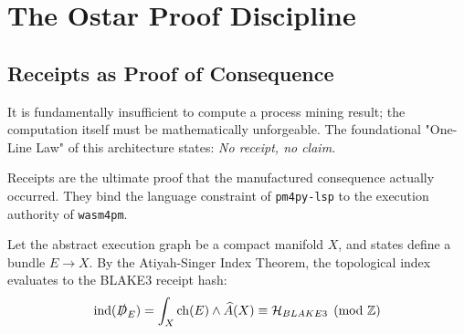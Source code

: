 
\chapter{The Ostar Proof Discipline}
\section{Receipts as Proof of Consequence}
It is fundamentally insufficient to compute a process mining result; the computation itself must be mathematically unforgeable. The foundational "One-Line Law" of this architecture states: \textit{No receipt, no claim.}

Receipts are the ultimate proof that the manufactured consequence actually occurred. They bind the language constraint of \texttt{pm4py-lsp} to the execution authority of \texttt{wasm4pm}.

Let the abstract execution graph be a compact manifold $X$, and states define a bundle $E \to X$. By the Atiyah-Singer Index Theorem, the topological index evaluates to the BLAKE3 receipt hash:
\begin{equation}
\operatorname{ind}(\slashed{D}_E) = \int_X \operatorname{ch}(E) \wedge \widehat{A}(X) \equiv \mathcal{H}_{BLAKE3} \pmod{\mathbb{Z}}
\end{equation}
